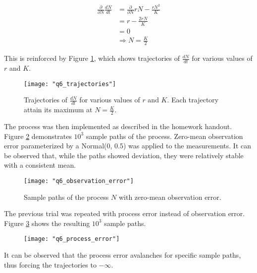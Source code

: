 \documentclass{article}[12 pt]
\begin{document}
\begin{align*}
	\frac{\partial}{\partial N} \frac{dN}{dt} &= \frac{\partial}{\partial N} rN - \frac{rN^2}{K} \\
	&= r -\frac{2rN}{K} \\
	&= 0 \\
	& \Rightarrow N = \frac{K}{2}
\end{align*}

\noindent
This is reinforced by Figure \ref{fig:q6_trajectories}, which shows trajectories of $\frac{dN}{dt}$ for various values of $r$ and $K$.

\begin{center}
	\begin{figure}[h]
		\centering
		\texttt{[image: "q6\_trajectories"]}
		\caption{Trajectories of $\frac{dN}{dt}$ for various values of $r$ and $K$.  Each trajectory attain its maximum at $N=\frac{K}{2}$. }
		\label{fig:q6_trajectories}
	\end{figure}
\end{center}

\noindent
The process was then implemented as described in the homework handout.  Figure \ref{fig:q6_observation_error} demonstrates $10^3$ sample paths of the process.  Zero-mean observation error parameterized by a Normal(0, 0.5) was applied to the measurements.   It can be observed that, while the paths showed deviation, they were relatively stable with a consistent mean.

\begin{center}
	\begin{figure}[H]
		\centering
		\texttt{[image: "q6\_observation\_error"]}
		\caption{Sample paths of the process $N$ with zero-mean observation error.}
		\label{fig:q6_observation_error}
	\end{figure}
\end{center}

\noindent
The previous trial was repeated with process error instead of observation error.  Figure \ref{fig:q6_process_error} shows the resulting $10^3$ sample paths.

\begin{center}
	\begin{figure}[H]
		\centering
		\texttt{[image: "q6\_process\_error"]}
		\caption{ }
		\label{fig:q6_process_error}
	\end{figure}
\end{center}

\noindent
It can be observed that the process error avalanches for specific sample paths, thus forcing the trajectories to $-\infty$.
\end{document}
